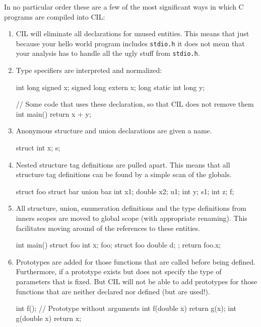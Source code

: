 \documentclass[letterpaper]{article}
\def\t#1{{\tt #1}}
\begin{document}
 In no particular order these are a few of the most significant ways in which
C programs are compiled into CIL:
\begin{enumerate}
\item CIL will eliminate all declarations for unused entities. This means that
just because your hello world program includes \t{stdio.h} it does not mean
that your analysis has to handle all the ugly stuff from \t{stdio.h}.

\item Type specifiers are interpreted and normalized:
\begin{cilcode}[global]
int long signed x;
signed long extern x;
long static int long y;

// Some code that uses these declaration, so that CIL does not remove them
int main() { return x + y; }
\end{cilcode}

\item Anonymous structure and union declarations are given a name.
\begin{cilcode}[global]
 struct { int x; } s;
\end{cilcode}

\item Nested structure tag definitions are pulled apart. This means that all
structure tag definitions can be found by a simple scan of the globals.

\begin{cilcode}[global]
struct foo {
   struct bar {
      union baz {
          int x1;
          double x2;
      } u1;
      int y;
   } s1;
   int z;
} f;
\end{cilcode}

\item All structure, union, enumeration definitions and the type definitions
from inners scopes are moved to global scope (with appropriate renaming). This
facilitates moving around of the references to these entities.

\begin{cilcode}[global]
int main() {
  struct foo {
        int x; } foo;
  {
     struct foo {
        double d;
     };
     return foo.x;
  }
}
\end{cilcode}

\item Prototypes are added for those functions that are called before being
defined. Furthermore, if a prototype exists but does not specify the type of
parameters that is fixed. But CIL will not be able to add prototypes for those
functions that are neither declared nor defined (but are used!).
\begin{cilcode}[global]
  int f();  // Prototype without arguments
  int f(double x) {
      return g(x);
  }
  int g(double x) {
     return x;
  }
\end{cilcode}


\end{enumerate}
\end{document}
